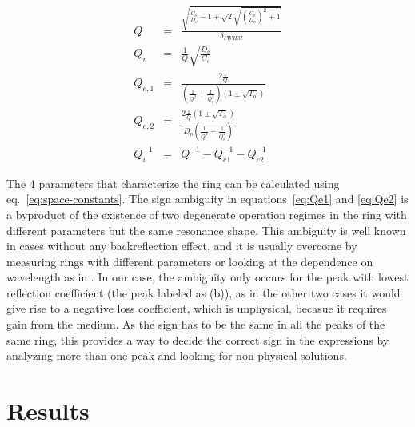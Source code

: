 \documentclass[10pt,letterpaper]{article}
\begin{document}
\begin{eqnarray}
    Q&=&\frac{\sqrt{\frac{C_o}{D_o}-1 + \sqrt{2}\sqrt{\left(\frac{C_o}{D_o}\right)^2+1}}}{\delta_{FWHM}} \label{eq:Q} \\
    Q_r&=&\frac{1}{Q}\sqrt{\frac{D_o}{C_o}} \label{eq:Qu}\\
    Q_{e,1}&=&\frac{2\frac{1}{Q}}{(\frac{1}{Q^2}+\frac{1}{Q_r^2})(1\pm\sqrt{T_o})}  \label{eq:Qe1}\\
    Q_{e,2}&=&\frac{2\frac{1}{Q}(1\pm\sqrt{T_o})}{D_o(\frac{1}{Q^2}+\frac{1}{Q_r^2})}  \label{eq:Qe2}\\
    Q_i^{-1}&=&Q^{-1}-Q_{e1}^{-1}-Q_{e2}^{-1} \label{eq:Qi} 
\end{eqnarray}

The 4 parameters that characterize the ring can be calculated using eq.~\ref{eq:space-constants}. 
The sign ambiguity in equations~\ref{eq:Qe1} and \ref{eq:Qe2} is a byproduct of the existence of two degenerate operation regimes in the ring with different parameters but the same resonance shape. This ambiguity is well known in cases without any backreflection effect, and it is usually  overcome by measuring rings with different parameters or looking at the dependence on wavelength as in \cite{McKinnon2009}. In our case, the ambiguity only occurs for the peak with lowest reflection coefficient (the peak labeled as (b)), as in the other two cases it would give rise to a negative loss coefficient, which is unphysical, becasue it requires gain from the medium. As the sign has to be the same in all the peaks of the same ring, this provides a way to decide the correct sign in the expressions by analyzing more than one peak and looking for non-physical solutions.


\section{Results}
\end{document}
